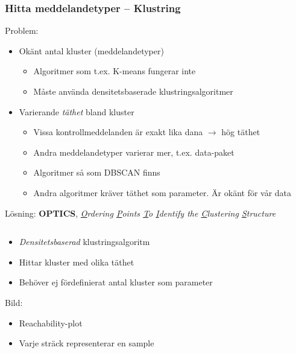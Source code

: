 \documentclass[xetex, 8pt]{beamer}
\begin{document}
    \begin{frame}
        \frametitle{Hitta meddelandetyper -- Klustring}
        Problem:
        \begin{itemize}
            \item Okänt antal kluster (meddelandetyper)
                \begin{itemize}
                    \item Algoritmer som t.ex. K-means fungerar inte
                    \item Måste använda densitetsbaserade klustringsalgoritmer
                \end{itemize}
            \item Varierande \emph{täthet} bland kluster
                \begin{itemize}
                    \item Vissa kontrollmeddelanden är exakt lika dana $\rightarrow$ hög täthet
                    \item Andra meddelandetyper varierar mer, t.ex. data-paket
                    \item Algoritmer så som DBSCAN finns
                    \item Andra algoritmer kräver täthet som parameter. Är okänt
                        för vår data
                \end{itemize}
        \end{itemize}
        Lösning: \textbf{OPTICS}, \scriptsize{
            \emph{\underline{O}rdering \underline{P}oints \underline{T}o
                  \underline{I}dentify the \underline{C}lustering 
                  \underline{S}tructure}}
        \vskip20pt
        \begin{columns}[t]
            \begin{column}[T]{6cm}
                \begin{itemize}
                    \item \emph{Densitetsbaserad} klustringsalgoritm
                    \item Hittar kluster med olika täthet
                    \item Behöver ej fördefinierat antal kluster som parameter
                \end{itemize}
                Bild:
                \begin{itemize}
                    \item Reachability-plot
                    \item Varje sträck representerar en sample

\end{itemize}
\end{column}
\end{columns}
\end{frame}
\end{document}
